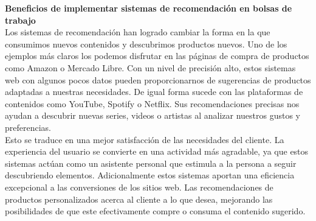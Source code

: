     \textbf{Beneficios de implementar sistemas de recomendación en bolsas de trabajo}\\
    Los sistemas de recomendación han logrado cambiar la forma en la que consumimos nuevos contenidos y descubrimos productos nuevos. Uno de los ejemplos más claros los podemos disfrutar en las páginas de compra de productos como Amazon o Mercado Libre. Con un nivel de precisión alto, estos sistemas web con algunos pocos datos pueden proporcionarnos de sugerencias de productos adaptadas a nuestras necesidades. De igual forma sucede con las plataformas de contenidos como YouTube, Spotify o Netflix. Sus recomendaciones precisas nos ayudan a descubrir nuevas series, videos o artistas al analizar nuestros gustos y preferencias.\\
    \newline
    Esto se traduce en una mejor satisfacción de las necesidades del cliente. La experiencia del usuario se convierte en una actividad más agradable, ya que estos sistemas actúan como un asistente personal que estimula a la persona a seguir descubriendo elementos. Adicionalmente estos sistemas aportan una eficiencia excepcional a las conversiones de los sitios web. Las recomendaciones de productos personalizados acerca al cliente a lo que desea, mejorando las posibilidades de que este efectivamente compre o consuma el contenido sugerido. \cite{mc6}
    
    
 
    
